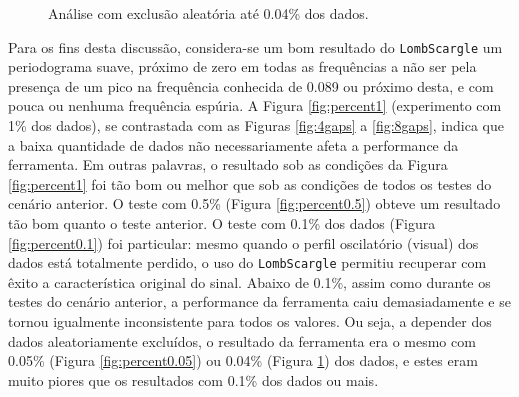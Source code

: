 \begin{figure}[ht!]
\vspace{-10mm}	
	\caption{Análise com exclusão aleatória até 0.04\% dos dados.}
	\vspace{1mm}	
	\begin{center}
	\end{center}
	\vspace{-1mm}	
	\label{fig:percent0.04}
\end{figure}

\clearpage{}
Para os fins desta discussão, considera-se um bom resultado do \texttt{LombScargle} um periodograma suave, próximo de zero em todas as frequências a não ser pela presença de um pico na frequência conhecida de 0.089 ou próximo desta, e com pouca ou nenhuma frequência espúria. A Figura \ref{fig:percent1} (experimento com 1\% dos dados), se contrastada com as Figuras \ref{fig:4gaps} a \ref{fig:8gaps}, indica que a baixa quantidade de dados não necessariamente afeta a performance da ferramenta. Em outras palavras, o resultado sob as condições da Figura \ref{fig:percent1} foi tão bom ou melhor que sob as condições de todos os testes do cenário anterior. O teste com 0.5\% (Figura \ref{fig:percent0.5}) obteve um resultado tão bom quanto o teste anterior. O teste com 0.1\% dos dados (Figura \ref{fig:percent0.1}) foi particular: mesmo quando o perfil oscilatório (visual) dos dados está totalmente perdido, o uso do \texttt{LombScargle} permitiu recuperar com êxito a característica original do sinal. Abaixo de 0.1\%, assim como durante os testes do cenário anterior, a performance da ferramenta caiu demasiadamente e se tornou igualmente inconsistente para todos os valores. Ou seja, a depender dos dados aleatoriamente excluídos, o resultado da ferramenta era o mesmo com 0.05\% (Figura \ref{fig:percent0.05}) ou 0.04\% (Figura \ref{fig:percent0.04}) dos dados, e estes eram muito piores que os resultados com 0.1\% dos dados ou mais.

